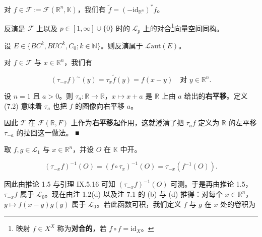 \begin{remark}

\begin{items}
\item

对 $ f \in \mathcal{F} := \mathcal{F}(\mathbb{R}^{n},\mathbb{K}) $，我们有 $ \tilde{f} = (-\mathrm{id}_{\mathbb{R}^{n}})^{\ast}f $。

\item

反演是 $ \mathcal{F} $ 上以及 $ p \in [1,\infty] \cup \{0\} $ 时的 $ \mathcal{L}_{p} $ 上的对合\footnote{映射 $ f \in X^{X} $ 称为\textbf{对合的}，若 $ f \circ f = \mathrm{id}_{X} $。}向量空间同构。

\item

设 $ E \in \{ BC^{k}, BUC^{k}, C_{0} ; k \in \mathbb{N} \} $。则反演属于 $ \mathcal{L}\mathrm{aut}(E) $。

\item

对 $ f \in \mathcal{F} $ 与 $ x \in \mathbb{R}^{n} $，我们有

\[
(\tau_{-x}f)^{\sim}(y) = \tau_{x}\tilde{f}(y) = f(x-y) \quad \text{对 } y \in \mathbb{R}^{n} .
\]
\item

设 $ n = 1 $ 且 $ a > 0 $。则 $ \tau_{a} : \mathbb{R} \to \mathbb{R} $，$ x \mapsto x+a $ 是 $ \mathbb{R} $ 上由 $ a $ 给出的\textbf{右平移}。定义 (7.2) 意味着 $ \tau_{a} $ 也把 $ f $ 的图像向右平移 $ a $。

\end{items}


因此 $ \mathcal{T} $ 在 $ \mathcal{F}(\mathbb{R},F) $ 上作为\textbf{右平移}起作用，这就澄清了把 $ \tau_{a}f $ 定义为 $ \mathbb{R} $ 的左平移 $ \tau_{-a} $ 的拉回这一做法。 \nobreak\hspace{0.35em}■

取 $ f, g \in \mathcal{L}_{1} $ 与 $ x \in \mathbb{R}^{n} $，并设 $ O $ 在 $ \mathbb{K} $ 中开。

\[
(\tau_{-x}f)^{-1}(O) = (f \circ \tau_{x})^{-1}(O) = \tau_{-x}(f^{-1}(O)) .
\]

因此由推论 1.5 与引理 IX.5.16 可知 $ (\tau_{-x}f)^{-1}(O) $ 可测。于是再由推论 1.5，$ \tau_{-x}f $ 属于 $ \mathcal{L}_{0} $。现在由注 1.2(d) 以及注 7.1 的 (b) 与 (d) 推得：对每个 $ x \in \mathbb{R}^{n} $，$ y \mapsto f(x-y)g(y) $ 属于 $ \mathcal{L}_{0} $。若此函数可积，我们定义 $ f $ 与 $ g $ 在 $ x $ 处的卷积为


\end{remark}
